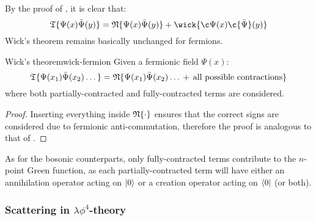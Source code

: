 By the proof of , it is clear that:
\begin{equation}
  \tempord\{\Psi(x) \bar{\Psi}(y)\} = \normord\{\Psi(x) \bar{\Psi}(y)\} + \wick{\c\Psi(x) \c{\bar{\Psi}}(y)}
\end{equation}
Wick's theorem remains basically unchanged for fermions.

\begin{theorem}{Wick's theorem}{wick-fermion}
  Given a fermionic field $ \Psi(x) $:
  \begin{equation}
    \mathfrak{T}\{\Psi(x_1) \bar{\Psi}(x_2) \dots\} = \mathfrak{N}\{\Psi(x_1) \bar{\Psi}(x_2) \dots \,+\, \text{all possible contractions}\}
  \end{equation}
  where both partially-contracted and fully-contracted terms are considered.
\end{theorem}

\begin{proofbox}
  \begin{proof}
    Inserting everything inside $ \mathfrak{N}\{\cdot\} $ ensures that the correct signs are considered due to fermionic anti-commutation, therefore the proof is analogous to that of .
  \end{proof}
\end{proofbox}

As for the bosonic counterparts, only fully-contracted terms contribute to the $ n $-point Green function, as each partially-contracted term will have either an annihilation operator acting on $ \ket{0} $ or a creation operator acting on $ \bra{0} $ (or both).

\subsubsection{Scattering in $ \lambda \phi^4 $-theory}
\label{sssec:lamb-4}

